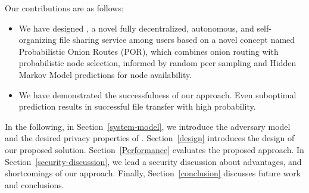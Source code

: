 Our contributions are as follows: 
\begin{itemize}
\item We have designed \name, a novel fully decentralized, autonomous,
and self-organizing file sharing service among users based on a novel
concept named Probabilistic Onion Routes (POR), which combines onion routing with
probabilistic node selection, informed by random peer sampling and
Hidden Markov Model predictions for node availability. 
\item  We have demonstrated the successfulness of our approach. Even
  suboptimal prediction results in successful file transfer with high
  probability. 
\end{itemize}

In the following, in Section~\ref{system-model}, we introduce the
adversary model and the desired privacy properties of \name. Section~\ref{design}
introduces the design of our proposed solution. Section~\ref{Performance}
evaluates the proposed approach. In Section~\ref{security-discussion}, we lead a security discussion
about advantages, and shortcomings of our approach.
Finally, Section~\ref{conclusion} discusses future work and conclusions.
